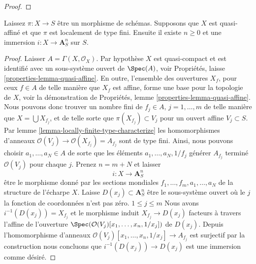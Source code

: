 \begin{proof}
\end{proof}

\begin{lemma}

\label{lemma-quasi-affine-finite-type-over-S}
Laissez $\pi : X \to S$ être un morphisme de schémas. Supposons que $X$ est quasi-affiné et que $\pi$ est localement de type fini. Ensuite il existe $n \geq 0$ et une immersion $i : X \to \mathbf{A}^n_S$ sur $S$.
\end{lemma}

\begin{proof}

Laisser $A = \Gamma(X, \mathcal{O}_X)$. Par hypothèse $X$ est quasi-compact et est identifié avec un sous-système ouvert de $\Spec(A)$, voir Propriétés, laisse \ref{properties-lemma-quasi-affine}. En outre, l'ensemble des ouvertures $X_f$, pour ceux $f \in A$ de telle manière que $X_f$ est affine, forme une base pour la topologie de $X$, voir la démonstration de Propriétés, lemme \ref{properties-lemma-quasi-affine}. Nous pouvons donc trouver un nombre fini de $f_j \in A$, $j = 1, \ldots, m$ de telle manière que
$X = \bigcup X_{f_j}$, et de telle sorte que $\pi(X_{f_j}) \subset V_j$ pour un ouvert affine $V_j \subset S$. Par lemme \ref{lemma-locally-finite-type-characterize}
les homomorphismes d'anneaux $\mathcal{O}(V_j) \to \mathcal{O}(X_{f_j}) = A_{f_j}$
sont de type fini. Ainsi, nous pouvons choisir $a_1, \ldots, a_N \in A$ de sorte que les éléments $a_1, \ldots, a_N, 1/f_j$ générer
$A_{f_j}$ terminé $\mathcal{O}(V_j)$ pour chaque $j$. Prenez $n = m + N$ et laisser
$$
i : X \longrightarrow \mathbf{A}^n_S
$$
être le morphisme donné par les sections mondiales
$f_1, \ldots, f_m, a_1, \ldots, a_N$ de la structure de l'écharpe $X$. Laisse $D(x_j) \subset \mathbf{A}^n_S$ être le sous-système ouvert où le
$j$la fonction de coordonnées n'est pas zéro. $1 \leq j \leq m$ Nous avons $i^{-1}(D(x_j)) = X_{f_j}$ et le morphisme induit $X_{f_j} \to D(x_j)$ facteurs à travers l'affine de l'ouverture $\Spec(\mathcal{O}(V_j)[x_1, \ldots, x_n, 1/x_j])$
de $D(x_j)$. Depuis l'homomorphisme d'anneaux
$\mathcal{O}(V_j)[x_1, \ldots, x_n, 1/x_j] \to A_{f_j}$ est surjectif par la construction nous concluons que $i^{-1}(D(x_j)) \to D(x_j)$
est une immersion comme désiré.

\end{proof}


